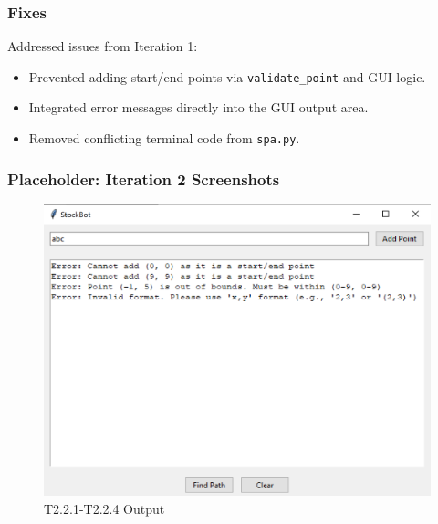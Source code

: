 \subsubsection{Fixes}
Addressed issues from Iteration 1:
\begin{itemize}
	\item Prevented adding start/end points via \verb|validate_point| and GUI logic.
	\item Integrated error messages directly into the GUI output area.
	\item Removed conflicting terminal code from \verb|spa.py|.
\end{itemize}

\newpage %

\subsubsection*{Placeholder: Iteration 2 Screenshots}
\begin{figure}[htbp!]
	\centering
	\includegraphics[width=1\linewidth]{Images/t2.2.x.png}
	\caption{T2.2.1-T2.2.4 Output}
	\label{fig:enter-label}
\end{figure}

